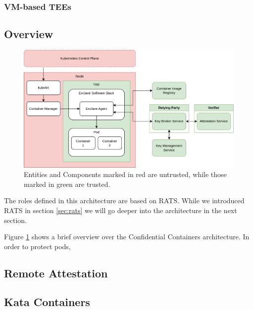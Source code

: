 \subsubsection*{VM-based TEEs}


\subsection{Overview}

\begin{figure}
  \centering
  \includegraphics[width=\linewidth]{resources/confidential-containers-overview.png}
  \caption[A simplified overview over the Confidential Containers architecture]{
    Entities and Components marked in red are untrusted, while those marked in
    green are trusted.
  }
  \label{fig:confidential-containers-overview}
\end{figure}

The roles defined in this architecture are based on RATS. While we introduced
RATS in section \ref{sec:rats} we will go deeper into the architecture in the
next section.

Figure \ref{fig:confidential-containers-overview} shows a brief overview over
the Confidential Containers architecture. In order to protect pods, 

\subsection{Remote Attestation}


\subsection{Kata Containers}

